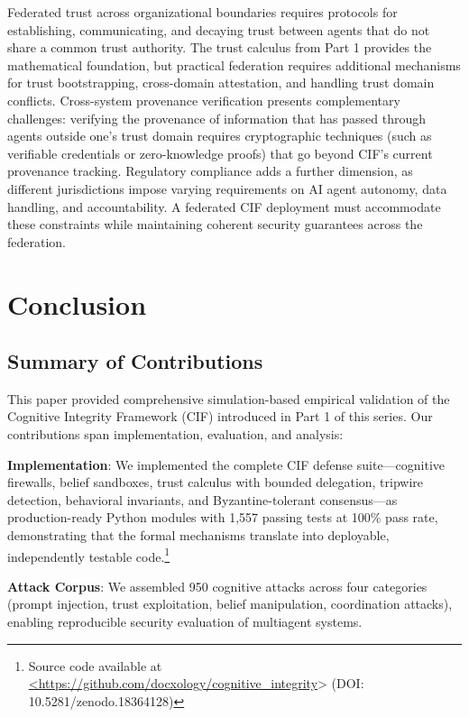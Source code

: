 \documentclass[
]{article}
\begin{document}
Federated trust across organizational boundaries requires protocols for
establishing, communicating, and decaying trust between agents that do
not share a common trust authority. The trust calculus from Part 1
provides the mathematical foundation, but practical federation requires
additional mechanisms for trust bootstrapping, cross-domain attestation,
and handling trust domain conflicts. Cross-system provenance
verification presents complementary challenges: verifying the provenance
of information that has passed through agents outside one's trust domain
requires cryptographic techniques (such as verifiable credentials or
zero-knowledge proofs) that go beyond CIF's current provenance tracking.
Regulatory compliance adds a further dimension, as different
jurisdictions impose varying requirements on AI agent autonomy, data
handling, and accountability. A federated CIF deployment must
accommodate these constraints while maintaining coherent security
guarantees across the federation.

\newpage

\newpage

\section{Conclusion}\label{sec:conclusion}

\subsection{Summary of Contributions}\label{summary-of-contributions}

This paper provided comprehensive simulation-based empirical validation
of the Cognitive Integrity Framework (CIF) introduced in Part 1 of this
series. Our contributions span implementation, evaluation, and analysis:

\textbf{Implementation}: We implemented the complete CIF defense
suite---cognitive firewalls, belief sandboxes, trust calculus with
bounded delegation, tripwire detection, behavioral invariants, and
Byzantine-tolerant consensus---as production-ready Python modules with
1,557 passing tests at 100\% pass rate, demonstrating that the formal
mechanisms translate into deployable, independently testable
code.\footnote{Source code available at \url{<https://github.com/docxology/cognitive_integrity}> (DOI: 10.5281/zenodo.18364128)}

\textbf{Attack Corpus}: We assembled 950 cognitive attacks across four
categories (prompt injection, trust exploitation, belief manipulation,
coordination attacks), enabling reproducible security evaluation of
multiagent systems.
\end{document}
